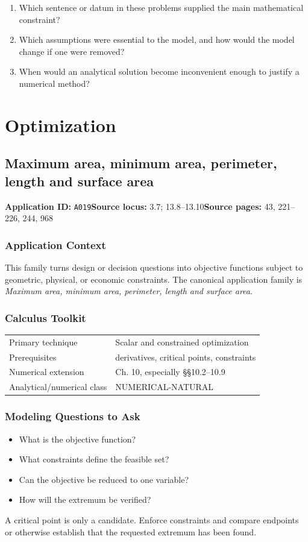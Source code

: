 \documentclass[11pt]{book}
\newcommand{\pid}[1]{\texttt{#1}}
\begin{document}
\begin{reflectionbox}\begin{enumerate}
\item Which sentence or datum in these problems supplied the main mathematical constraint?
\item Which assumptions were essential to the model, and how would the model change if one were removed?
\item When would an analytical solution become inconvenient enough to justify a numerical method?
\end{enumerate}\end{reflectionbox}
\part{Optimization}
\chapter{Maximum area, minimum area, perimeter, length and surface area}\label{app:A019}
\textbf{Application ID:} \pid{A019}\quad \textbf{Source locus:} 3.7; 13.8–13.10\quad \textbf{Source pages:} 43, 221–226, 244, 968
\section*{Application Context}
This family turns design or decision questions into objective functions subject to geometric, physical, or economic constraints. The canonical application family is \emph{Maximum area, minimum area, perimeter, length and surface area}.
\section*{Calculus Toolkit}
\begin{tabularx}{\textwidth}{@{}lX@{}}\toprule
Primary technique & Scalar and constrained optimization \\
Prerequisites & derivatives, critical points, constraints \\
Numerical extension & Ch. 10, especially §§10.2–10.9 \\
Analytical/numerical class & NUMERICAL-NATURAL \\
\bottomrule\end{tabularx}
\section*{Modeling Questions to Ask}\begin{itemize}
\item What is the objective function?
\item What constraints define the feasible set?
\item Can the objective be reduced to one variable?
\item How will the extremum be verified?
\end{itemize}
\begin{errorbox}A critical point is only a candidate. Enforce constraints and compare endpoints or otherwise establish that the requested extremum has been found.\end{errorbox}
\end{document}
